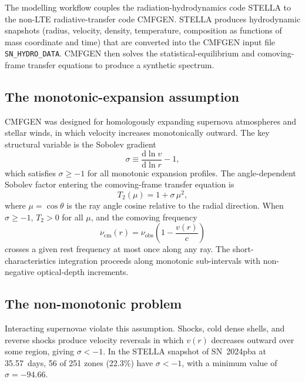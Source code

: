 \documentclass[11pt,a4paper]{article}
\begin{document}
The modelling workflow couples the radiation-hydrodynamics code STELLA
to the non-LTE radiative-transfer code CMFGEN.  STELLA produces
hydrodynamic snapshots (radius, velocity, density, temperature,
composition as functions of mass coordinate and time) that are converted
into the CMFGEN input file \texttt{SN\_HYDRO\_DATA}.  CMFGEN then solves
the statistical-equilibrium and comoving-frame transfer equations to
produce a synthetic spectrum.

\subsection{The monotonic-expansion assumption}

CMFGEN was designed for homologously expanding supernova atmospheres and
stellar winds, in which velocity increases monotonically outward.  The
key structural variable is the Sobolev gradient
\begin{equation}
  \sigma \equiv \frac{\mathrm{d}\ln v}{\mathrm{d}\ln r} - 1 ,
  \label{eq:sigma}
\end{equation}
which satisfies $\sigma \geq -1$ for all monotonic expansion profiles.
The angle-dependent Sobolev factor entering the comoving-frame transfer
equation is
\begin{equation}
  T_2(\mu) = 1 + \sigma\,\mu^2 ,
  \label{eq:T2}
\end{equation}
where $\mu = \cos\theta$ is the ray angle cosine relative to the radial
direction.  When $\sigma \geq -1$, $T_2 > 0$ for all $\mu$, and the
comoving frequency
\begin{equation}
  \nu_{\mathrm{cm}}(r) = \nu_{\mathrm{obs}}\left(1 - \frac{v(r)}{c}\right)
  \label{eq:nu_cm}
\end{equation}
crosses a given rest frequency at most once along any ray.  The
short-characteristics integration proceeds along monotonic sub-intervals
with non-negative optical-depth increments.

\subsection{The non-monotonic problem}

Interacting supernovae violate this assumption.  Shocks, cold dense
shells, and reverse shocks produce velocity reversals in which
$v(r)$ decreases outward over some region, giving $\sigma < -1$.
In the STELLA snapshot of SN~2024pba at 35.57~days, 56 of 251 zones
(22.3\%) have $\sigma < -1$, with a minimum value of $\sigma = -94.66$.
\end{document}
